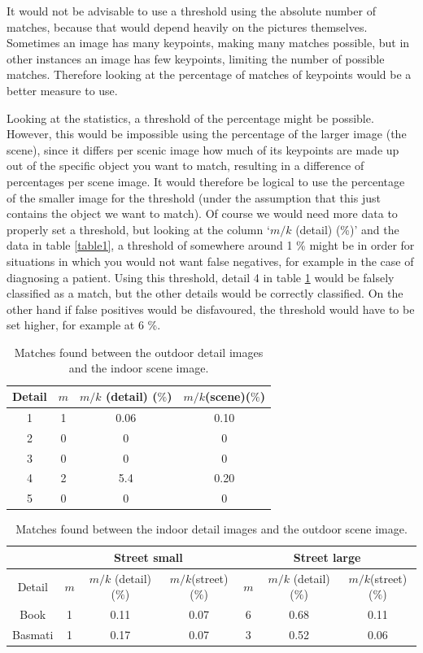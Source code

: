 \documentclass{article}
\begin{document}
It would not be advisable to use a threshold using the absolute number of matches, because that would depend heavily on the pictures themselves. Sometimes an image has many keypoints, making many matches possible, but in other instances an image has few keypoints, limiting the number of possible matches. Therefore looking at the percentage of matches of keypoints would be a better measure to use. 

Looking at the statistics, a threshold of the percentage might be possible. However, this would be impossible using the percentage of the larger image (the scene), since it differs per scenic image how much of its keypoints are made up out of the specific object you want to match, resulting in a difference of percentages per scene image. It would therefore be logical to use the percentage of the smaller image for the threshold (under the assumption that this just contains the object we want to match). Of course we would need more data to properly set a threshold, but looking at the column `$m/k$ (detail) (\%)' and the data in table \ref{table1}, a threshold of somewhere around 1 \% might be in order for situations in which you would not want false negatives, for example in the case of diagnosing a patient. Using this threshold, detail 4 in table \ref{table2} would be falsely classified as a match, but the other details would be correctly classified. On the other hand if false positives would be disfavoured, the threshold would have to be set higher, for example at 6 \%.

\begin{table}[H]
\centering
 \caption{Matches found between the outdoor detail images and the indoor scene image.}
 \label{table2}
 \begin{tabular}{|c|c|c|c|}
 \hline
  Detail & $m$ & $m/k$ (detail) ($\%$) & $m/k$(scene)($\%$) \\
  \hline
  1 & 1 & 0.06 & 0.10 \\
  2 & 0 & 0 & 0 \\
  3 & 0 & 0 & 0 \\
  4 & 2 & 5.4 & 0.20 \\
  5 & 0 & 0 & 0 \\
  \hline
 \end{tabular}
\end{table}

\begin{table}[H]
\centering
 \caption{Matches found between the indoor detail images and the outdoor scene image.}
 \label{table3}
 \begin{tabular}{|c|c|c|c||c|c|c|}
 \hline
 & \multicolumn{3}{c||}{Street small} & \multicolumn{3}{c|}{Street large} \\
 \hline
  Detail & $m$ & $m/k$ (detail) ($\%$) & $m/k$(street) ($\%$) & $m$ & $m/k$ (detail) ($\%$) & $m/k$(street) ($\%$) \\
  \hline
  Book & 1 & 0.11 & 0.07 & 6 & 0.68 & 0.11 \\
  Basmati & 1 & 0.17 & 0.07 & 3 & 0.52 & 0.06 \\
  \hline
 \end{tabular}
\end{table}
\end{document}
